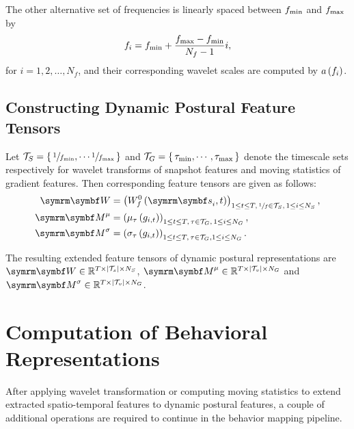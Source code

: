The other alternative set of frequencies is linearly spaced between $f_{\textnormal{min}}$ and $f_{\textnormal{max}}$ by
\begin{equation}
	f_i = f_{\textnormal{min}} + \frac{f_{\textnormal{max}} - f_{\textnormal{min}}}{N_f-1}i,
\end{equation}
for $i=1,2,\dots,N_f$, and their corresponding wavelet scales are computed by $a\left(f_i\right)$.

\subsection{Constructing Dynamic Postural Feature Tensors}
Let $\mathcal{T}_S=\left\{ \, \sfrac{1}{f_{\textnormal{min}}}, \cdots \sfrac{1}{f_{\textnormal{max}}} \, \right\}$ and $\mathcal{T}_G=\left\{ \, \tau_{\textnormal{min}}, \cdots, \tau_{\textnormal{max}} \, \right\}$ denote the timescale sets respectively for wavelet transforms of snapshot features and moving statistics of gradient features. Then corresponding feature tensors are given as follows:
\begin{equation}
	\begin{aligned}
		\V{W}        & = \rbr{W^0_{f}\rbr{\V{s}_i, t}}_{1 \leq t \leq T, \, \sfrac{1}{f} \in \mathcal{T}_S, \, 1 \leq i \leq N_S}, \\
		\V{M}^\mu    & = \rbr{\mu_\tau\rbr{g_{i,t}}}_{1\leq t \leq T, \, \tau \in \mathcal{T}_G, \, 1 \leq i \leq  N_G},           \\
		\V{M}^\sigma & = \rbr{\sigma_\tau\rbr{g_{i,t}}}_{1\leq t \leq T, \, \tau \in \mathcal{T}_G, 1 \leq i \leq N_G}.
	\end{aligned}
\end{equation}

The resulting extended feature tensors of dynamic postural representations are $\V{W} \in \mathbb{R}^{T \times \card*{\mathcal{T}_s} \times N_S}$, $\V{M}^\mu \in \mathbb{R}^{T \times \card*{\mathcal{T}_v} \times N_G}$ and $\V{M}^\sigma \in \mathbb{R}^{T \times \card*{\mathcal{T}_v} \times N_G}$.

\section{Computation of Behavioral Representations}
After applying wavelet transformation or computing moving statistics to extend extracted spatio-temporal features to dynamic postural features, a couple of additional operations are required to continue in the behavior mapping pipeline.

